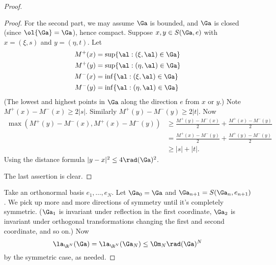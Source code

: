 \begin{proof}
\begin{proof}
For the second part, we may assume $\Ga$ is bounded, and $\Ga$ is closed (since $\ol{\Ga}=\Ga$), hence compact. Suppose $x,y\in S(\Ga,e)$ with $x=(\xi,s)$ and $y=(\eta,t)$. Let
\begin{align*}
M^+(x)&=\sup\{\al:(\xi,\al)\in \Ga\}\\
M^+(y)&=\sup\{\al:(\eta,\al)\in \Ga\}\\
M^-(x)&=\inf\{\al:(\xi,\al)\in \Ga\}\\
M^-(y)&=\inf\{\al:(\eta,\al)\in \Ga\}
\end{align*}
(The lowest and highest points in $\Ga$ along the direction $e$ from $x$ or $y$.) Note $M^+(x)-M^-(x)\ge 2|s|$. Similarly $M^+(y)-M^-(y)\ge 2|t|$. Now
\begin{align*}
\max(M^+(y)-M^-(x),M^+(x)-M^-(y))
&\ge \frac{M^+(y)-M^-(x)}{2}+\frac{M^+(x)-M^-(y)}{2}\\
&=\frac{M^+(x)-M^-(y)}{2}+\frac{M^+(y)-M^-(y)}{2}\\
&\ge |s|+|t|.
\end{align*}
Using the distance formula $|y-x|^2\le 4\rad(\Ga)^2$.

The last assertion is clear.
\end{proof}
Take an orthonormal basis $e_1,\ldots, e_N$. Let $\Ga_0=\Ga$ and $\Ga_{n+1}=S(\Ga_n,e_{n+1})$. 
We pick up more and more directions of symmetry until it's completely symmetric. 
($\Ga_1$ is invariant under reflection in the first coordinate, $\Ga_2$ is invariant under orthogonal transformations changing the first and second coordinate, and so on.)
Now
\[
\la_{\R^N}(\Ga)=\la_{\R^N}(\Ga_N)\le\Om_N \rad(\Ga)^N
\]
by the symmetric case, as needed.
\end{proof}
